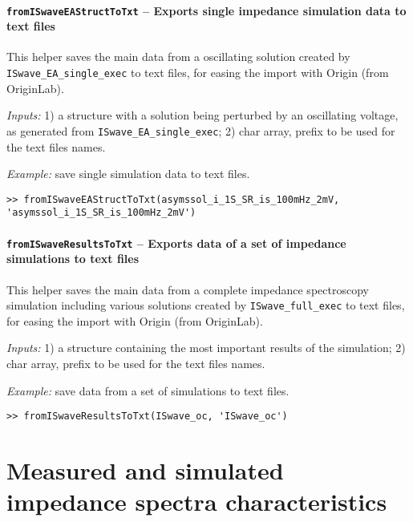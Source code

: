		

				
\paragraph{\texttt{from\-ISwaveEA\-Struct\-ToTxt} -- Exports single impedance simulation data to text files}
This helper saves the main data from a oscillating solution created by \texttt{ISwave\_EA\_single\_exec} to text files, for easing the import with Origin (from OriginLab).

\textit{Inputs:} 1) a structure with a solution being perturbed by an oscillating voltage, as generated from \texttt{ISwave\_EA\_single\_exec};
2) char array, prefix to be used for the text files names.




\textit{Example:} save single simulation data to text files.
\begin{lstlisting}[style=Matlab-editor]
>> fromISwaveEAStructToTxt(asymssol_i_1S_SR_is_100mHz_2mV, 'asymssol_i_1S_SR_is_100mHz_2mV')
\end{lstlisting}

\paragraph{\texttt{from\-ISwave\-Results\-ToTxt} -- Exports data of a set of impedance simulations to text files}
This helper saves the main data from a complete impedance spectroscopy simulation including various solutions created by \texttt{ISwave\_full\_exec} to text files, for easing the import with Origin (from OriginLab).

\textit{Inputs:} 1) a structure containing the most important results of the simulation;
2) char array, prefix to be used for the text files names.




\textit{Example:} save data from a set of simulations to text files.
\begin{lstlisting}[style=Matlab-editor]
>> fromISwaveResultsToTxt(ISwave_oc, 'ISwave_oc')
\end{lstlisting}

\section{Measured and simulated impedance spectra characteristics}

